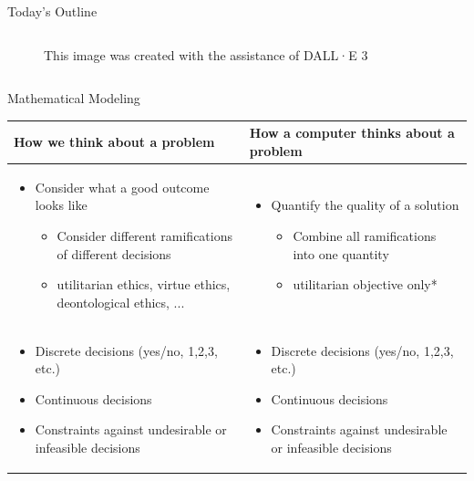 \documentclass[10pt, aspectratio=169]{beamer}
\begin{document}
\begin{frame}{Today's Outline}
\begin{columns}
\begin{column}{0.5\textwidth}
\begin{figure}
                \caption{This image was created with the assistance of DALL·E 3}
            \end{figure}
        \end{column}
    \end{columns}
\end{frame}

\begin{frame}{Mathematical Modeling}
    \begin{tabular}[t]{p{6.5cm} | p{6.5cm}}
        How we think about a problem & How a computer thinks about a problem \\
        \hline
        \begin{itemize}
            \item Consider what a good outcome looks like
            \begin{itemize}
                \item Consider different ramifications of different decisions 
                \item utilitarian ethics, virtue ethics, deontological ethics, ...
            \end{itemize}
        \end{itemize} & \begin{itemize}
            \item Quantify the quality of a solution
            \begin{itemize}
                \item Combine all ramifications into one quantity
                \item utilitarian objective only*
            \end{itemize}
        \end{itemize} \\
        \begin{itemize}
            \item Discrete decisions (yes/no, 1,2,3, etc.)  
            \item Continuous decisions
            \item Constraints against undesirable or infeasible decisions
        \end{itemize} & \begin{itemize}
            \item Discrete decisions (yes/no, 1,2,3, etc.)  
            \item Continuous decisions
            \item Constraints against undesirable or infeasible decisions
        \end{itemize} \\
    \end{tabular}
\end{frame}
\end{document}
